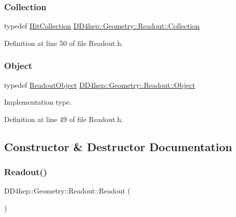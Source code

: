 \subsubsection{\texorpdfstring{Collection}{Collection}}
{\footnotesize\ttfamily typedef \hyperlink{class_d_d4hep_1_1_geometry_1_1_hit_collection}{Hit\+Collection} \hyperlink{class_d_d4hep_1_1_geometry_1_1_readout_ac1c39a13ec9bd42d658319fa48cac81d}{D\+D4hep\+::\+Geometry\+::\+Readout\+::\+Collection}}



Definition at line 50 of file Readout.\+h.

\hypertarget{class_d_d4hep_1_1_geometry_1_1_readout_ae25c79e6b7a94df1de7b1a2cf6df7ae4}{}\label{class_d_d4hep_1_1_geometry_1_1_readout_ae25c79e6b7a94df1de7b1a2cf6df7ae4} 
\subsubsection{\texorpdfstring{Object}{Object}}
{\footnotesize\ttfamily typedef \hyperlink{class_d_d4hep_1_1_geometry_1_1_readout_object}{Readout\+Object} \hyperlink{class_d_d4hep_1_1_geometry_1_1_readout_ae25c79e6b7a94df1de7b1a2cf6df7ae4}{D\+D4hep\+::\+Geometry\+::\+Readout\+::\+Object}}



Implementation type. 



Definition at line 49 of file Readout.\+h.



\subsection{Constructor \& Destructor Documentation}
\hypertarget{class_d_d4hep_1_1_geometry_1_1_readout_a494549d8bcb34fda8d23c46701050f76}{}\label{class_d_d4hep_1_1_geometry_1_1_readout_a494549d8bcb34fda8d23c46701050f76} 
\subsubsection{\texorpdfstring{Readout()}{Readout()}\hspace{0.1cm}{\footnotesize\ttfamily [1/5]}}
{\footnotesize\ttfamily D\+D4hep\+::\+Geometry\+::\+Readout\+::\+Readout (\begin{DoxyParamCaption}{ }\end{DoxyParamCaption})\hspace{0.3cm}{\ttfamily [default]}}



